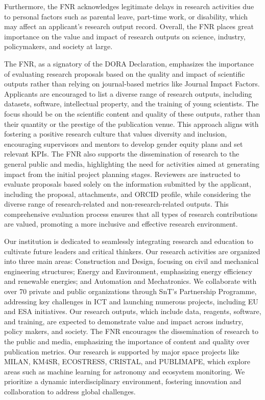 \documentclass{article}
\begin{document}
Furthermore, the FNR acknowledges legitimate delays in research activities due to personal factors such as parental leave, part-time work, or disability, which may affect an applicant's research output record. Overall, the FNR places great importance on the value and impact of research outputs on science, industry, policymakers, and society at large.

The FNR, as a signatory of the DORA Declaration, emphasizes the importance of evaluating research proposals based on the quality and impact of scientific outputs rather than relying on journal-based metrics like Journal Impact Factors. Applicants are encouraged to list a diverse range of research outputs, including datasets, software, intellectual property, and the training of young scientists. The focus should be on the scientific content and quality of these outputs, rather than their quantity or the prestige of the publication venue. This approach aligns with fostering a positive research culture that values diversity and inclusion, encouraging supervisors and mentors to develop gender equity plans and set relevant KPIs. The FNR also supports the dissemination of research to the general public and media, highlighting the need for activities aimed at generating impact from the initial project planning stages. Reviewers are instructed to evaluate proposals based solely on the information submitted by the applicant, including the proposal, attachments, and ORCID profile, while considering the diverse range of research-related and non-research-related outputs. This comprehensive evaluation process ensures that all types of research contributions are valued, promoting a more inclusive and effective research environment.

Our institution is dedicated to seamlessly integrating research and education to cultivate future leaders and critical thinkers. Our research activities are organized into three main areas: Construction and Design, focusing on civil and mechanical engineering structures; Energy and Environment, emphasizing energy efficiency and renewable energies; and Automation and Mechatronics. We collaborate with over 70 private and public organizations through SnT’s Partnership Programme, addressing key challenges in ICT and launching numerous projects, including EU and ESA initiatives. Our research outputs, which include data, reagents, software, and training, are expected to demonstrate value and impact across industry, policy makers, and society. The FNR encourages the dissemination of research to the public and media, emphasizing the importance of content and quality over publication metrics. Our research is supported by major space projects like MILAN, KM4SR, ECOSTRESS, CRISTAL, and PUBLIMAPE, which explore areas such as machine learning for astronomy and ecosystem monitoring. We prioritize a dynamic interdisciplinary environment, fostering innovation and collaboration to address global challenges.
\end{document}
